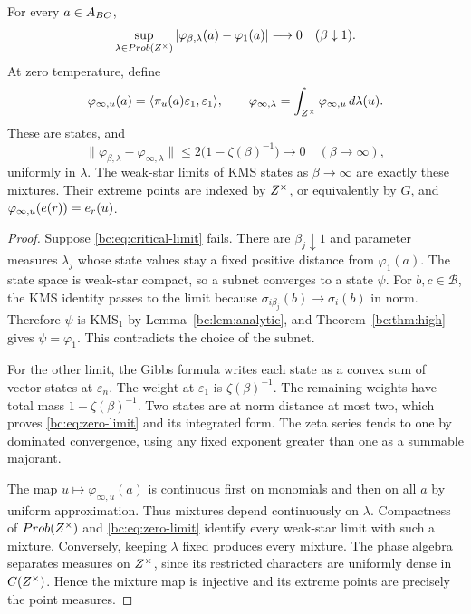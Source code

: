 \begin{proposition}\label{bc:prop:limits}
For every \(a\in A_{BC}\),
\begin{equation}\label{bc:eq:critical-limit}
 \sup_{\lambda\in Prob(Z^{\times})}
       |\varphi_{\beta,\lambda}(a)-\varphi_1(a)|\longrightarrow0
       \quad(\beta\downarrow1).
\end{equation}
At zero temperature, define
\[
 \varphi_{\infty,u}(a)
  =\langle\pi_u(a)\varepsilon_1,\varepsilon_1\rangle,
 \qquad
 \varphi_{\infty,\lambda}=\int_{Z^{\times}}\varphi_{\infty,u}\,d\lambda(u).
\]
These are states, and
\begin{equation}\label{bc:eq:zero-limit}
 \|\varphi_{\beta,\lambda}-\varphi_{\infty,\lambda}\|
       \leq2\bigl(1-\zeta(\beta)^{-1}\bigr)\longrightarrow0
       \quad(\beta\to\infty),
\end{equation}
uniformly in \(\lambda\). The weak-star limits of KMS states as
\(\beta\to\infty\) are exactly these mixtures. Their extreme points
are indexed by \(Z^{\times}\), or equivalently by \(G\), and
\(\varphi_{\infty,u}(e(r))=e_r(u)\).
\end{proposition}

\begin{proof}
Suppose \eqref{bc:eq:critical-limit} fails. There are \(\beta_j\downarrow1\)
and parameter measures \(\lambda_j\) whose state values stay a fixed
positive distance from \(\varphi_1(a)\). The state space is weak-star
compact, so a subnet converges to a state \(\psi\). For
\(b,c\in\mathcal B\), the KMS identity passes to the limit because
\(\sigma_{i\beta_j}(b)\to\sigma_i(b)\) in norm. Therefore \(\psi\)
is KMS\(_1\) by Lemma~\ref{bc:lem:analytic}, and
Theorem~\ref{bc:thm:high} gives \(\psi=\varphi_1\). This contradicts
the choice of the subnet.

For the other limit, the Gibbs formula writes each state as a convex
sum of vector states at \(\varepsilon_n\). The weight at
\(\varepsilon_1\) is \(\zeta(\beta)^{-1}\). The remaining weights
have total mass \(1-\zeta(\beta)^{-1}\). Two states are at norm distance
at most two, which proves \eqref{bc:eq:zero-limit} and its integrated form.
The zeta series tends to one by dominated convergence, using any fixed
exponent greater than one as a summable majorant.

The map \(u\mapsto\varphi_{\infty,u}(a)\) is continuous first on
monomials and then on all \(a\) by uniform approximation. Thus mixtures
depend continuously on \(\lambda\). Compactness of \(Prob(Z^{\times})\)
and \eqref{bc:eq:zero-limit} identify every weak-star limit with such a
mixture. Conversely, keeping \(\lambda\) fixed produces every mixture.
The phase algebra separates measures on \(Z^{\times}\), since its restricted
characters are uniformly dense in \(C(Z^{\times})\). Hence the mixture map
is injective and its extreme points are precisely the point measures.
\end{proof}

